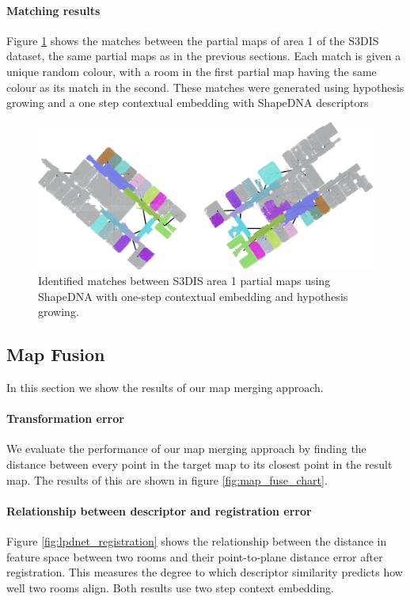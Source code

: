 \paragraph{Matching results}
Figure \ref{fig:area_1_match} shows the matches between the partial maps of area 1 of the S3DIS dataset, the same partial maps as in the previous sections. Each match is given a unique random colour, with a room in the first partial map having the same colour as its match in the second. These matches were generated using hypothesis growing and a one step contextual embedding with ShapeDNA descriptors


\begin{figure}[h]
    \centering
    \includegraphics*[width=\textwidth]{./fig/area_1_match.pdf}
    \caption{Identified matches between S3DIS area 1 partial maps using ShapeDNA with one-step contextual embedding and hypothesis growing.}
    \label{fig:area_1_match}
\end{figure}

\subsection{Map Fusion}
In this section we show the results of our map merging approach. 

\paragraph{Transformation error}
We evaluate the performance of our map merging approach by finding the distance between every point in the target map to its closest point in the result map. The results of this are shown in figure \ref{fig:map_fuse_chart}.

\paragraph{Relationship between descriptor and registration error}
Figure \ref{fig:lpdnet_registration} shows the relationship between the distance in feature space between two rooms and their point-to-plane distance error after registration. This measures the degree to which descriptor similarity predicts how well two rooms align. Both results use two step context embedding.

